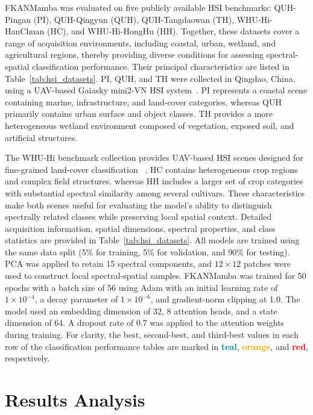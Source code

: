 \documentclass{ieeeaccess}
\begin{document}
FKANMamba was evaluated on five publicly available HSI benchmarks: QUH-Pingan (PI), QUH-Qingyun (QUH), QUH-Tangdaowan (TH), WHU-Hi-HanChuan (HC), and WHU-Hi-HongHu (HH). Together, these datasets cover a range of acquisition environments, including coastal, urban, wetland, and agricultural regions, thereby providing diverse conditions for assessing spectral-spatial classification performance. Their principal characteristics are listed in Table~\ref{tab:hsi_datasets}. PI, QUH, and TH were collected in Qingdao, China, using a UAV-based Gaiasky mini2-VN HSI system~\cite{ref30}. PI represents a coastal scene containing marine, infrastructure, and land-cover categories, whereas QUH primarily contains urban surface and object classes. TH provides a more heterogeneous wetland environment composed of vegetation, exposed soil, and artificial structures.

The WHU-Hi benchmark collection provides UAV-based HSI scenes designed for fine-grained land-cover classification ~\cite{ref31}. HC contains heterogeneous crop regions and complex field structures, whereas HH includes a larger set of crop categories with substantial spectral similarity among several cultivars. These characteristics make both scenes useful for evaluating the model's ability to distinguish spectrally related classes while preserving local spatial context. Detailed acquisition information, spatial dimensions, spectral properties, and class statistics are provided in Table~\ref{tab:hsi_datasets}. All models are trained using the same data split (5\% for training, 5\% for validation, and 90\% for testing). PCA was applied to retain 15 spectral components, and $12\times12$ patches were used to construct local spectral-spatial samples. FKANMamba was trained for 50 epochs with a batch size of 56 using Adam with an initial learning rate of $1\times10^{-4}$, a decay parameter of $1\times10^{-6}$, and gradient-norm clipping at 1.0. The model used an embedding dimension of 32, 8 attention heads, and a state dimension of 64. A dropout rate of 0.7 was applied to the attention weights during training. For clarity, the best, second-best, and third-best values in each row of the classification performance tables are marked in \textcolor{teal}{\textbf{teal}}, \textcolor{orange}{\textbf{orange}}, and \textcolor{red}{\textbf{red}}, respectively.

\section{Results Analysis}
\end{document}
